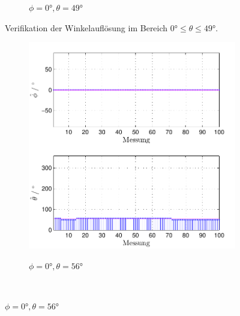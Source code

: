 \begin{figure}
\begin{subfigure}[b]{0.48\textwidth}
                \label{fig:Foto_DSP_Draufsicht}
                \caption{$\phi=0°, \theta = 49°$}
        \end{subfigure}
        \caption{Verifikation der Winkelauflösung im Bereich $0° \leq \theta \leq 49°$.}
        \label{fig:verifikation_winkelaufloesung_1}
\end{figure}









\begin{figure}
        \centering
        \begin{subfigure}[b]{0.48\textwidth}
                \centering
                \includegraphics[width=\textwidth]{grafiken/04_Echtzeitversuch/MALE_Phi_0_Theta_56}
                \label{fig:Foto_DSP_Draufsicht_Seitanansicht}
                \caption{$\phi=0°, \theta = 56°$}
        \end{subfigure}
        ~ %

\end{figure}

